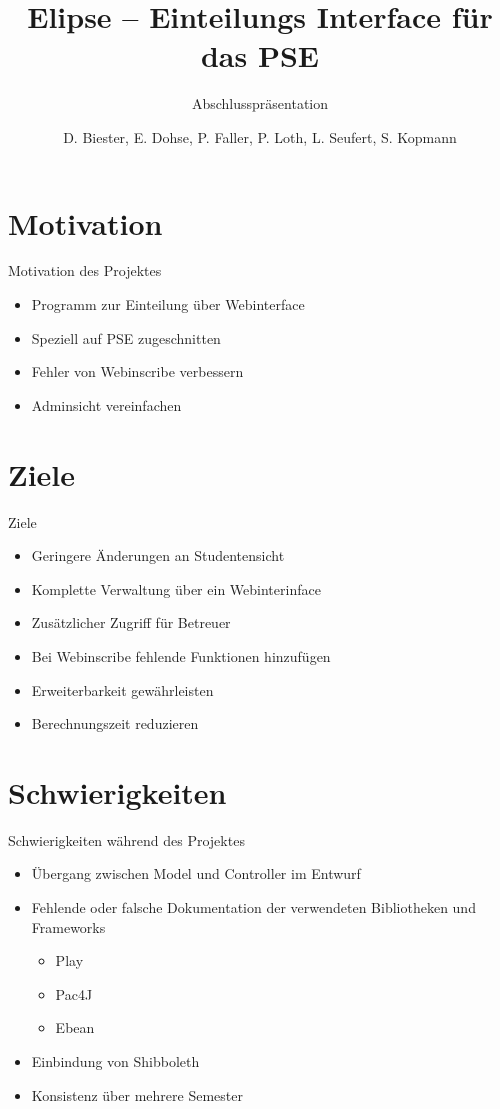 \documentclass[18pt]{beamer}
\title[Elipse]{Elipse -- Einteilungs Interface für das PSE}
\subtitle{Abschlusspräsentation}
\author{D. Biester, E. Dohse, P. Faller, P. Loth, L. Seufert, S. Kopmann}
\institute{IPD Snelting}
\begin{document}

\begin{frame}
\titlepage
\end{frame}


\section{Motivation}
\begin{frame}{Motivation des Projektes}
\begin{itemize}
\item Programm zur Einteilung über Webinterface
\item Speziell auf PSE zugeschnitten
\item Fehler von Webinscribe verbessern
\item Adminsicht vereinfachen
\end{itemize}
\end{frame}

\section{Ziele}
\begin{frame}{Ziele}
\begin{itemize}
\item Geringere Änderungen an Studentensicht
\item Komplette Verwaltung über ein Webinterinface
\item Zusätzlicher Zugriff für Betreuer
\item Bei Webinscribe fehlende Funktionen hinzufügen
\item Erweiterbarkeit gewährleisten
\item Berechnungszeit reduzieren
\end{itemize}
\end{frame}

\section{Schwierigkeiten}
\begin{frame}{Schwierigkeiten während des Projektes}
\begin{itemize}
\item Übergang zwischen Model und Controller im Entwurf
\item Fehlende oder falsche Dokumentation der verwendeten Bibliotheken
und Frameworks
\begin{itemize}
\item Play
\item Pac4J
\item Ebean
\end{itemize}
\item Einbindung von Shibboleth
\item Konsistenz über mehrere Semester
\end{itemize}
\end{frame}
\end{document}
